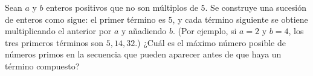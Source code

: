 Sean $a$ y $b$ enteros positivos que no son múltiplos de $5$. Se construye una sucesión de enteros como sigue: el primer término es $5$, y cada término siguiente se obtiene multiplicando el anterior por $a$ y añadiendo $b$. (Por ejemplo, si $a = 2$ y $b = 4$, los tres primeros términos son $5,14,32$.) ¿Cuál es el máximo número posible de números primos en la secuencia que pueden aparecer antes de que haya un término compuesto? 